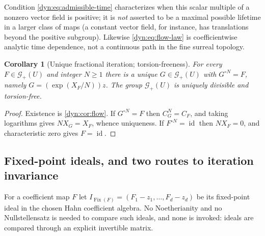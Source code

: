 \documentclass[11pt,letterpaper]{article}
\newtheorem{corollary}[corollary]{Corollary}
\theoremstyle{definition}
\theoremstyle{remark}
\newcommand{\GG}{\mathscr G}
\newcommand{\id}{\operatorname{id}}
\newcommand{\Fix}{\operatorname{Fix}}
\numberwithin{equation}{section}
\begin{document}
Condition \eqref{dyn:eq:admissible-time} characterizes when this scalar
multiple of a nonzero vector field is positive; it is \emph{not} asserted
to be a maximal possible lifetime in a larger class of maps (a constant
vector field, for instance, has translations beyond the positive subgroup).
Likewise \eqref{dyn:eq:flow-law} is coefficientwise analytic time
dependence, not a continuous path in the fine surreal topology.

\begin{corollary}[Unique fractional iteration; torsion-freeness]
\label{dyn:cor:roots}
For every $F\in\GG_+(U)$ and integer $N\ge1$ there is a unique
$G\in\GG_+(U)$ with $G^{\circ N}=F$, namely $G=(\exp(X_F/N))z$. The group
$\GG_+(U)$ is uniquely divisible and torsion-free.
\end{corollary}
\begin{proof}
Existence is \cref{dyn:cor:flow}. If $G^{\circ N}=F$ then $C_G^{N}=C_F$,
and taking logarithms gives $NX_G=X_F$, whence uniqueness. If
$F^{\circ N}=\id$ then $NX_F=0$, and characteristic zero gives $F=\id$.
\end{proof}

\subsection{Fixed-point ideals, and two routes to iteration invariance}
\label{dyn:sec:fixed}

For a coefficient map $F$ let $I_{\Fix(F)}=(F_1-z_1,\dots,F_d-z_d)$ be its
fixed-point ideal in the chosen Hahn coefficient algebra. No Noetherianity
and no Nullstellensatz is needed to compare such ideals, and none is
invoked: ideals are compared through an explicit invertible matrix.
\end{document}
